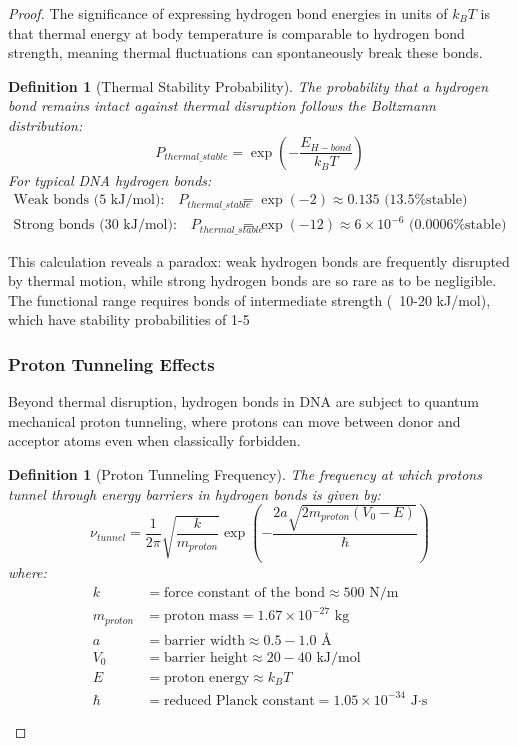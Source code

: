 \documentclass[12pt,a4paper]{article}
\newtheorem{definition}[theorem]{Definition}
\begin{document}
\begin{proof}
The significance of expressing hydrogen bond energies in units of $k_BT$ is that thermal energy at body temperature is comparable to hydrogen bond strength, meaning thermal fluctuations can spontaneously break these bonds.

\begin{definition}[Thermal Stability Probability]
The probability that a hydrogen bond remains intact against thermal disruption follows the Boltzmann distribution:
\begin{equation}
P_{thermal\_stable} = \exp\left(-\frac{E_{H-bond}}{k_BT}\right)
\end{equation}
For typical DNA hydrogen bonds:
\begin{align}
\text{Weak bonds (5 kJ/mol):} \quad P_{thermal\_stable} &= \exp(-2) \approx 0.135 \text{ (13.5\% stable)} \\
\text{Strong bonds (30 kJ/mol):} \quad P_{thermal\_stable} &= \exp(-12) \approx 6 \times 10^{-6} \text{ (0.0006\% stable)}
\end{align}
\end{definition}

This calculation reveals a paradox: weak hydrogen bonds are frequently disrupted by thermal motion, while strong hydrogen bonds are so rare as to be negligible. The functional range requires bonds of intermediate strength (~10-20 kJ/mol), which have stability probabilities of 1-5%

\subsubsection{Proton Tunneling Effects}

Beyond thermal disruption, hydrogen bonds in DNA are subject to quantum mechanical proton tunneling, where protons can move between donor and acceptor atoms even when classically forbidden.

\begin{definition}[Proton Tunneling Frequency]
The frequency at which protons tunnel through energy barriers in hydrogen bonds is given by:
\begin{equation}
\nu_{tunnel} = \frac{1}{2\pi} \sqrt{\frac{k}{m_{proton}}} \exp\left(-\frac{2a\sqrt{2m_{proton}(V_0-E)}}{\hbar}\right)
\end{equation}
where:
\begin{align}
k &= \text{force constant of the bond} \approx 500 \text{ N/m} \\
m_{proton} &= \text{proton mass} = 1.67 \times 10^{-27} \text{ kg} \\
a &= \text{barrier width} \approx 0.5-1.0 \text{ Å} \\
V_0 &= \text{barrier height} \approx 20-40 \text{ kJ/mol} \\
E &= \text{proton energy} \approx k_BT \\
\hbar &= \text{reduced Planck constant} = 1.05 \times 10^{-34} \text{ J·s}
\end{align}
\end{definition}


\end{proof}
\end{document}
